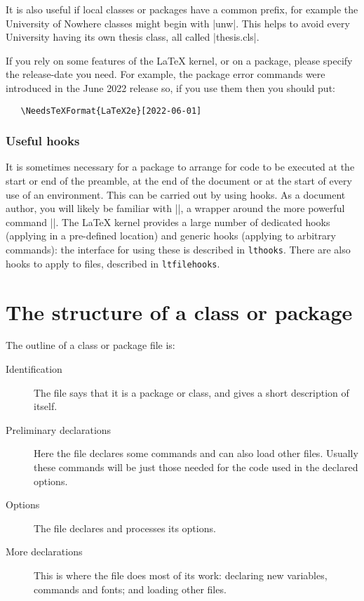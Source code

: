 \documentclass{ltxguide}
\begin{document}
It is also useful if local classes or packages have a common prefix, for
example the University of Nowhere classes might begin with |unw|. This helps to
avoid every University having its own thesis class, all called |thesis.cls|.

If you rely on some features of the \LaTeX{} kernel, or on a package,
please specify the release-date you need.  For example, the package
error commands were introduced in the June 2022 release so, if you use
them then you should put:
\begin{verbatim}
   \NeedsTeXFormat{LaTeX2e}[2022-06-01]
\end{verbatim}

\subsubsection{Useful hooks}

It is sometimes necessary for a package to arrange for code to be
executed at the start or end of the preamble, at the end of the document
or at the start of every use of an environment. This can be carried
out by using hooks. As a document author, you will likely be familiar with
|\AtBeginDocument|, a wrapper around the more powerful command |\AddToHook|.
The \LaTeX{} kernel provides a large number of dedicated hooks (applying in
a pre-defined location) and generic hooks (applying to arbitrary commands):
the interface for using these is described in \texttt{lthooks}. There are
also hooks to apply to files, described in \texttt{ltfilehooks}.

\section{The structure of a class or package}
\label{sec:structure}

The outline of a class or package file is:
\begin{description}
\item[Identification] The file says that it is a \LaTeXe{} package or
   class, and gives a short description of itself.
\item[Preliminary declarations]
   Here the file declares some commands and can also load
   other files.  Usually these commands will be just those needed for
   the code used in the declared options.
\item[Options] The file declares and processes its options.
\item[More declarations] This is where the file does most of its work:
   declaring new variables, commands and fonts; and loading other files.
\end{description}
\end{document}
